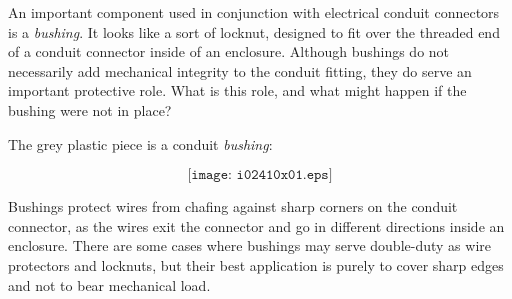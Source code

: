 

An important component used in conjunction with electrical conduit connectors is a {\it bushing}.  It looks like a sort of locknut, designed to fit over the threaded end of a conduit connector inside of an enclosure.  Although bushings do not necessarily add mechanical integrity to the conduit fitting, they do serve an important protective role.  What is this role, and what might happen if the bushing were not in place?







The grey plastic piece is a conduit {\it bushing}:

$$\texttt{[image: i02410x01.eps]}$$

Bushings protect wires from chafing against sharp corners on the conduit connector, as the wires exit the connector and go in different directions inside an enclosure.  There are some cases where bushings may serve double-duty as wire protectors and locknuts, but their best application is purely to cover sharp edges and not to bear mechanical load.












